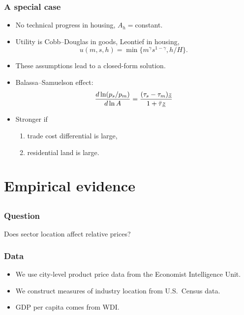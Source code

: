 \documentclass[compress,mathserif]{beamer}
\newcounter{perc}
\newcounter{percek}
\renewcommand{\time}[1]{\addtocounter{percek}{#1}}
\begin{document}


\begin{frame}\frametitle{A special case}
\begin{itemize}
    \item No technical progress in housing, $A_h=$constant.
    \item Utility is Cobb--Douglas in goods, Leontief in housing,
\[
u(m,s,h) = \min\{m^\gamma s^{1-\gamma} ,h/H\}.
\]
    \item These assumptions lead to a closed-form solution.
    \item Balassa--Samuelson effect:
\[
\frac{d\ln (p_s/p_m)}{d\ln A} = \frac{(\tau_s-\tau_m)\underline{z}}{1+\Bar\tau \underline{z}}
\]
    \item Stronger if
    \begin{enumerate}
      \item trade cost differential is large,
      \item residential land is large.
    \end{enumerate}

\end{itemize}
\end{frame}
\time 3


\section{Empirical evidence}
\subsection{}

\begin{frame}\frametitle{Question}
\label{evidence}
Does sector location affect relative prices?
\end{frame}

\begin{frame}\frametitle{Data}
\begin{itemize}
\item We use city-level product price data from the Economist Intelligence Unit.
\item We construct measures of industry location from U.S.~Census data.
\item GDP per capita comes from WDI.
\end{itemize}
\end{frame}
\end{document}
